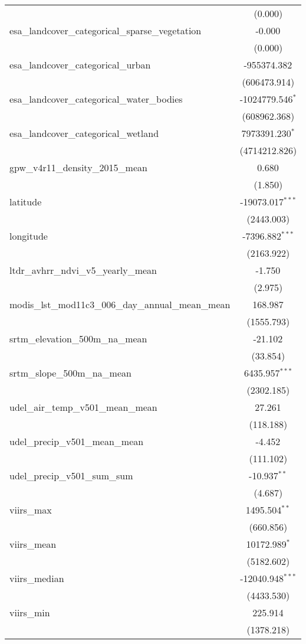 \begin{table}[!htbp]
\begin{tabular}{@{\extracolsep{5pt}}lc}
  & (0.000) \\
 esa_landcover_categorical_sparse_vegetation & -0.000$^{}$ \\
  & (0.000) \\
 esa_landcover_categorical_urban & -955374.382$^{}$ \\
  & (606473.914) \\
 esa_landcover_categorical_water_bodies & -1024779.546$^{*}$ \\
  & (608962.368) \\
 esa_landcover_categorical_wetland & 7973391.230$^{*}$ \\
  & (4714212.826) \\
 gpw_v4r11_density_2015_mean & 0.680$^{}$ \\
  & (1.850) \\
 latitude & -19073.017$^{***}$ \\
  & (2443.003) \\
 longitude & -7396.882$^{***}$ \\
  & (2163.922) \\
 ltdr_avhrr_ndvi_v5_yearly_mean & -1.750$^{}$ \\
  & (2.975) \\
 modis_lst_mod11c3_006_day_annual_mean_mean & 168.987$^{}$ \\
  & (1555.793) \\
 srtm_elevation_500m_na_mean & -21.102$^{}$ \\
  & (33.854) \\
 srtm_slope_500m_na_mean & 6435.957$^{***}$ \\
  & (2302.185) \\
 udel_air_temp_v501_mean_mean & 27.261$^{}$ \\
  & (118.188) \\
 udel_precip_v501_mean_mean & -4.452$^{}$ \\
  & (111.102) \\
 udel_precip_v501_sum_sum & -10.937$^{**}$ \\
  & (4.687) \\
 viirs_max & 1495.504$^{**}$ \\
  & (660.856) \\
 viirs_mean & 10172.989$^{*}$ \\
  & (5182.602) \\
 viirs_median & -12040.948$^{***}$ \\
  & (4433.530) \\
 viirs_min & 225.914$^{}$ \\
  & (1378.218) \\

\end{tabular}
\end{table}
